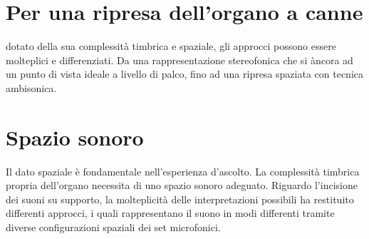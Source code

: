 \newcommand{\mylanguages}{english,italian} %
\newcommand{\mytitle}{Pratiche sperimentali di registrazione dell'organo a canne, differenti approcci di ripresa del suono}
\newcommand{\mysubtitle}{Tecniche e Tecnologie di Ripresa e Registrazione Audio}
\newcommand{\authorone}{Doralma A. Palestra}
\newcommand{\institutione}{Conservatorio N. Piccinni di Bari}
\newcommand{\emailone}{doralma.palestra@gmail.com}



\maketitle
\thispagestyle{empty}

\section*{Per una ripresa dell'organo a canne}
dotato della sua complessità timbrica e spaziale, 
gli approcci possono essere molteplici e differenziati.
Da una rappresentazione stereofonica che si àncora ad un punto di 
vista ideale a livello di palco, fino ad una ripresa spaziata con tecnica 
ambisonica.

\section*{Spazio sonoro}
Il dato spaziale è fondamentale nell'esperienza d'ascolto. La complessità
 timbrica propria dell'organo necessita di uno spazio sonoro adeguato. 
 Riguardo l'incisione dei suoni su supporto, la molteplicità delle 
 interpretazioni possibili ha restituito differenti approcci, i quali 
 rappresentano il suono in modi differenti tramite diverse configurazioni
  spaziali dei set microfonici.   %
